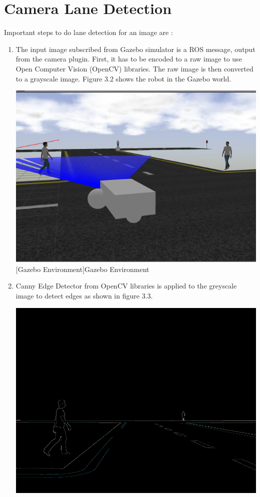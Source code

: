 \documentclass[%
xelatex,
	oneside,		%
	12pt,			%
	parskip=half,	%
	abstracton,
	chapterprefix=true%
    appendixprefix=true]
{scrbook}
\begin{document}
		\section{Camera Lane Detection}
	\vspace*{0.5cm}
	Important steps to do lane detection for an image are : 
	\begin{enumerate}
\item	The input image subscribed from Gazebo simulator is a ROS message, output from the camera plugin. First, it has to be encoded to a raw image to use Open Computer Vision (OpenCV) libraries. The raw image is then converted to a grayscale image. Figure 3.2 shows the robot in the Gazebo world. 
\begin{center}
\includegraphics[scale=0.4]{fig/canny1.png}
[Gazebo Environment]{Gazebo Environment}
\label{fig:gazebo}
\end{center}
\item Canny Edge Detector from OpenCV libraries is applied to the greyscale image to detect edges as shown in figure 3.3.
	\begin{center}
\includegraphics[scale=0.3]{fig/canny.png}

\end{center}
\end{enumerate}
\end{document}
